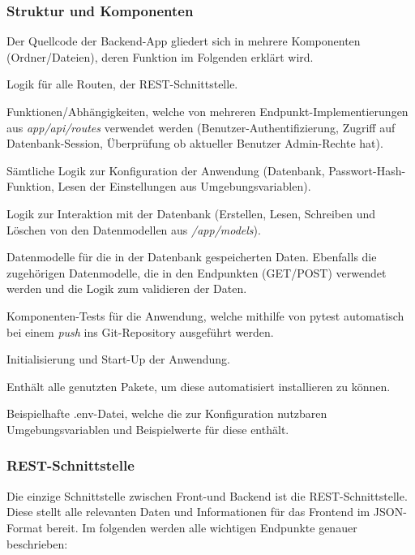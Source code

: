 \documentclass[conference,a4paper]{cs-techrep}
\begin{document}
\subsubsection{Struktur und Komponenten}
Der Quellcode der Backend-App gliedert sich in mehrere Komponenten (Ordner/Dateien), deren Funktion im Folgenden erklärt wird.
\begin{description}[style=standard]
	\item[app/api/routes] Logik für alle Routen, der REST-Schnittstelle.
	\item[app/api/dependencies.py] Funktionen/Abhängigkeiten, welche von mehreren Endpunkt-Implementierungen aus \emph{app/api/routes} verwendet werden (Benutzer-Authentifizierung, Zugriff auf Datenbank-Session, Überprüfung ob aktueller Benutzer Admin-Rechte hat).
	\item[app/core] Sämtliche Logik zur Konfiguration der Anwendung (Datenbank, Passwort-Hash-Funktion, Lesen der Einstellungen aus Umgebungsvariablen).
	\item[app/crud] Logik zur Interaktion mit der Datenbank (Erstellen, Lesen, Schreiben und Löschen von den Datenmodellen aus \emph{/app/models}).
	\item[app/models] Datenmodelle für die in der Datenbank  gespeicherten Daten. Ebenfalls die zugehörigen Datenmodelle, die in den Endpunkten (GET/POST) verwendet werden und die Logik zum validieren der Daten.
	\item[app/tests] Komponenten-Tests für die Anwendung, welche mithilfe von pytest \cite{pytest} automatisch bei einem \emph{push} ins Git-Repository ausgeführt werden.
	\item[main.py] Initialisierung und Start-Up der Anwendung.
	\item[requirements.txt] Enthält alle genutzten Pakete, um diese automatisiert installieren zu können.
	\item[.env.example] Beispielhafte .env-Datei, welche die zur Konfiguration nutzbaren Umgebungsvariablen und Beispielwerte für diese enthält.
\end{description}

\subsubsection{REST-Schnittstelle}
Die einzige Schnittstelle zwischen Front-und Backend ist die REST-Schnittstelle. Diese stellt alle relevanten Daten und Informationen für das Frontend im JSON-Format bereit. Im folgenden werden alle wichtigen Endpunkte genauer beschrieben:
\end{document}
